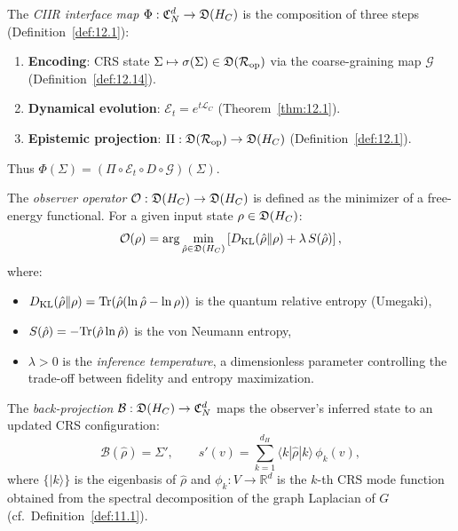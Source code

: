 \begin{definition}\label{def:13.2}
The \emph{CIIR interface map}
$\Phi : \mathfrak{C}_N^d \to \mathfrak{D}(H_C)$ is the composition
of three steps (Definition~\ref{def:12.1}):
\begin{enumerate}
  \item \textbf{Encoding}: CRS state $\Sigma \mapsto \sigma(\Sigma) \in
    \mathfrak{D}(\mathcal{R}_{\mathrm{op}})$ via the coarse-graining map
    $\mathcal{G}$ (Definition~\ref{def:12.14}).
  \item \textbf{Dynamical evolution}: $\mathcal{E}_t = e^{t\mathcal{L}_C}$
    (Theorem~\ref{thm:12.1}).
  \item \textbf{Epistemic projection}: $\Pi : \mathfrak{D}(\mathcal{R}_{\mathrm{op}})
    \to \mathfrak{D}(H_C)$ (Definition~\ref{def:12.1}).
\end{enumerate}
Thus $\Phi(\Sigma) = (\Pi \circ \mathcal{E}_t \circ D \circ \mathcal{G})(\Sigma)$.
\end{definition}

\begin{definition}\label{def:13.3}
The \emph{observer operator}
$\mathcal{O} : \mathfrak{D}(H_C) \to \mathfrak{D}(H_C)$ is defined
as the minimizer of a free-energy functional.  For a given input state
$\rho \in \mathfrak{D}(H_C)$:
\begin{equation}\label{eq:observer-opt}
  \mathcal{O}(\rho) = \arg\min_{\hat{\rho} \in \mathfrak{D}(H_C)}
  \left[
    D_{\mathrm{KL}}(\hat{\rho} \| \rho) + \lambda\, S(\hat{\rho})
  \right],
\end{equation}
where:
\begin{itemize}
  \item $D_{\mathrm{KL}}(\hat{\rho} \| \rho) =
    \mathrm{Tr}(\hat{\rho}(\ln \hat{\rho} - \ln \rho))$ is the quantum relative
    entropy (Umegaki),
  \item $S(\hat{\rho}) = -\mathrm{Tr}(\hat{\rho} \ln \hat{\rho})$ is the
    von Neumann entropy,
  \item $\lambda > 0$ is the \emph{inference temperature}, a dimensionless
    parameter controlling the trade-off between fidelity and entropy
    maximization.
\end{itemize}
\end{definition}

\begin{definition}\label{def:13.4}
The \emph{back-projection}
$\mathcal{B} : \mathfrak{D}(H_C) \to \mathfrak{C}_N^d$ maps the
observer's inferred state to an updated CRS configuration:
\begin{equation}\label{eq:back-proj}
  \mathcal{B}(\hat{\rho}) = \Sigma',
  \qquad
  s'(v) = \sum_{k=1}^{d_H} \langle k | \hat{\rho} | k \rangle\, \phi_k(v),
\end{equation}
where $\{|k\rangle\}$ is the eigenbasis of $\hat{\rho}$ and
$\phi_k : V \to \mathbb{R}^d$ is the $k$-th CRS mode function obtained
from the spectral decomposition of the graph Laplacian of $G$
(cf.~Definition~\ref{def:11.1}).
\end{definition}

